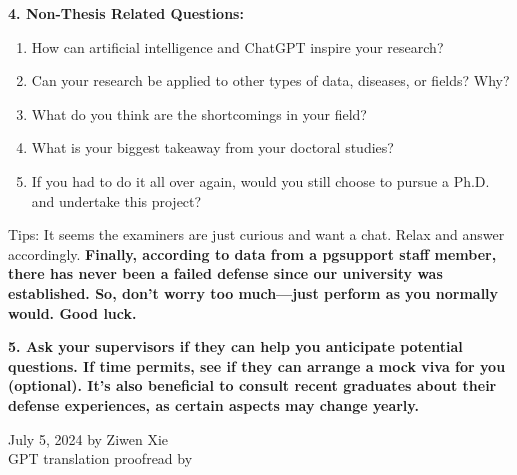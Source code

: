\textbf{4. Non-Thesis Related Questions:}
\begin{enumerate}
    \item How can artificial intelligence and ChatGPT inspire your research?
    \item Can your research be applied to other types of data, diseases, or fields? Why?
    \item What do you think are the shortcomings in your field?
    \item What is your biggest takeaway from your doctoral studies?
    \item If you had to do it all over again, would you still choose to pursue a Ph.D. and undertake this project?
\end{enumerate}
Tips: It seems the examiners are just curious and want a chat. Relax and answer accordingly. \textbf{Finally, according to data from a pgsupport staff member, there has never been a failed defense since our university was established. So, don't worry too much—just perform as you normally would. Good luck.}

\textbf{5. Ask your supervisors if they can help you anticipate potential questions. If time permits, see if they can arrange a mock viva for you (optional). It's also beneficial to consult recent graduates about their defense experiences, as certain aspects may change yearly.}

\begin{flushright}
    July 5, 2024 by Ziwen Xie \\
    GPT translation proofread by \Shiyao
\end{flushright}
